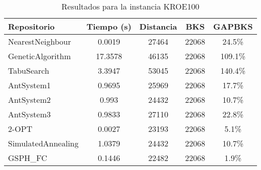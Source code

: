 \begin{table}[H]
\centering
\caption{Resultados para la instancia KROE100}
\begin{tabular}{|l|c|c|c|c|}
\hline
\textbf{Repositorio} & \textbf{Tiempo (s)} & \textbf{Distancia} & \textbf{BKS} & \textbf{GAPBKS} \\ 
\hline
NearestNeighbour & 0.0019 & 27464 & 22068 & 24.5\% \\ 
GeneticAlgorithm & 17.3578 & 46135 & 22068 & 109.1\% \\ 
TabuSearch & 3.3947 & 53045 & 22068 & 140.4\% \\ 
AntSystem1 & 0.9695 & 25969 & 22068 & 17.7\% \\ 
AntSystem2 & 0.993 & 24432 & 22068 & 10.7\% \\ 
AntSystem3 & 0.9833 & 27110 & 22068 & 22.8\% \\ 
2-OPT & 0.0027 & 23193 & 22068 & 5.1\% \\ 
SimulatedAnnealing & 1.0379 & 24432 & 22068 & 10.7\% \\ 
GSPH_FC & 0.1446 & 22482 & 22068 & 1.9\% \\ 
\hline
\end{tabular}
\end{table}
